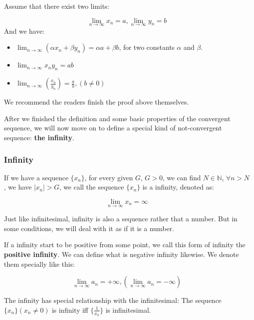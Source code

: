 \newpage

\begin{theorem}

Assume that there exist two limits:

\[\lim_{n \to \infty} x_n = a, \lim_{n \to \infty} y_n = b\]
And we have:
\begin{itemize}
    \item $\lim_{n \to \infty} (\alpha x_n + \beta y_n) = \alpha a + \beta b$, for two constants $\alpha$ and $\beta$.
    \item $\lim_{n \to \infty} x_ny_n = ab$
    \item $\lim_{n \to \infty} (\frac{x_n}{y_n}) = \frac{a}{b},(b\neq0)$
\end{itemize}
\end{theorem}
We recommend the readers finish the proof above themselves.

After we finished the definition and some basic properties of the convergent sequence, we will now move on to define a special kind of not-convergent sequence: \textbf{the infinity}.

\subsubsection{Infinity}

\begin{definition}[Infinity]
If we have a sequence $\{x_n\}$, for every given $G$, $G>0$, we can find $N \in \mathbb{N}$, $\forall n > N$, we have $|x_n|>G$, we call the sequence $\{x_n\}$ is a infinity, denoted as:

\[\lim_{n \to \infty} x_n = \infty\]

\end{definition}

Just like infinitesimal, infinity is also a sequence rather that a number. But in some conditions, we will deal with it as if it is a number.

If a infinity start to be positive from some point, we call this form of infinity the \textbf{positive infinity}. We can define what is negative infinity likewise. We denote them specially like this:

\[
\lim_{n \to \infty} a_n = + \infty,(\lim_{n \to \infty} a_n = - \infty)
\]

\begin{theorem}
The infinity has special relationship with the infinitesimal:
The sequence $\{x_n\}(x_n \neq 0)$ is infinity iff $\{\frac{1}{x_n}\}$ is infinitesimal. 
\end{theorem}

